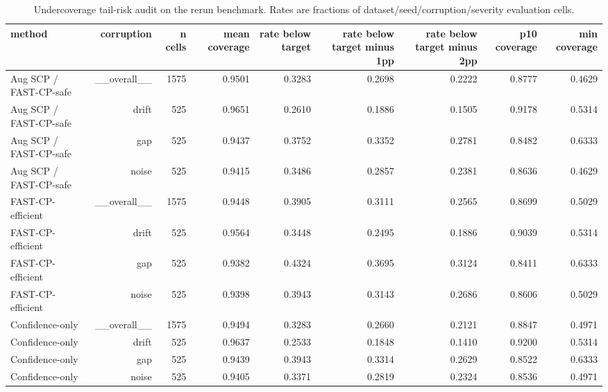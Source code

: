 \begin{table}[t]
\centering
\small
\begin{tabular}{lrrrrrrrr}
\toprule
method & corruption & n cells & mean coverage & rate below target & rate below target minus 1pp & rate below target minus 2pp & p10 coverage & min coverage \\
\midrule
Aug SCP / FAST-CP-safe & \_\_overall\_\_ & 1575 & 0.9501 & 0.3283 & 0.2698 & 0.2222 & 0.8777 & 0.4629 \\
Aug SCP / FAST-CP-safe & drift & 525 & 0.9651 & 0.2610 & 0.1886 & 0.1505 & 0.9178 & 0.5314 \\
Aug SCP / FAST-CP-safe & gap & 525 & 0.9437 & 0.3752 & 0.3352 & 0.2781 & 0.8482 & 0.6333 \\
Aug SCP / FAST-CP-safe & noise & 525 & 0.9415 & 0.3486 & 0.2857 & 0.2381 & 0.8636 & 0.4629 \\
FAST-CP-efficient & \_\_overall\_\_ & 1575 & 0.9448 & 0.3905 & 0.3111 & 0.2565 & 0.8699 & 0.5029 \\
FAST-CP-efficient & drift & 525 & 0.9564 & 0.3448 & 0.2495 & 0.1886 & 0.9039 & 0.5314 \\
FAST-CP-efficient & gap & 525 & 0.9382 & 0.4324 & 0.3695 & 0.3124 & 0.8411 & 0.6333 \\
FAST-CP-efficient & noise & 525 & 0.9398 & 0.3943 & 0.3143 & 0.2686 & 0.8606 & 0.5029 \\
Confidence-only & \_\_overall\_\_ & 1575 & 0.9494 & 0.3283 & 0.2660 & 0.2121 & 0.8847 & 0.4971 \\
Confidence-only & drift & 525 & 0.9637 & 0.2533 & 0.1848 & 0.1410 & 0.9200 & 0.5314 \\
Confidence-only & gap & 525 & 0.9439 & 0.3943 & 0.3314 & 0.2629 & 0.8522 & 0.6333 \\
Confidence-only & noise & 525 & 0.9405 & 0.3371 & 0.2819 & 0.2324 & 0.8536 & 0.4971 \\
\bottomrule
\end{tabular}
\caption{Undercoverage tail-risk audit on the rerun benchmark. Rates are fractions of dataset/seed/corruption/severity evaluation cells.}
\label{tab:tail_risk}
\end{table}
